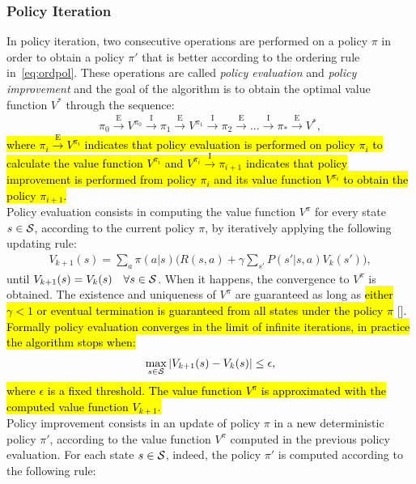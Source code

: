 \subsubsection{Policy Iteration}
In policy iteration, two consecutive operations are performed on a policy $\pi$ in order to obtain a policy $\pi'$ that is better according to the ordering rule in~\eqref{eq:ordpol}. These operations are called \emph{policy evaluation} and \emph{policy improvement} and the goal of the algorithm is to obtain the optimal value function $V^{*}$ through the sequence:
\begin{align}
\pi_{0} \xrightarrow{\text{E}} V^{\pi_{0}} \xrightarrow{\text{I}} \pi_{1} \xrightarrow{\text{E}} V^{\pi_{1}} \xrightarrow{\text{I}} \pi_{2} \xrightarrow{\text{E}} ... \xrightarrow{\text{I}} \pi_{*} \xrightarrow{\text{E}} V^{*},
\end{align}
\hl{where $\pi_{i} \xrightarrow{\text{E}} V^{\pi_{i}}$ indicates that policy evaluation is performed on policy $\pi_{i}$ to calculate the value function $V^{\pi_{i}}$ and $V^{\pi_{i}} \xrightarrow{\text{I}} \pi_{i+1}$ indicates that policy improvement is performed from policy $\pi_{i}$ and its value function $V^{\pi_{i}}$ to obtain the policy $\pi_{i+1}$.}\\
\newline
Policy evaluation consists in computing the value function $V^{\pi}$ for every state $s \in \mathcal{S}$, according to the current policy $\pi$, by iteratively applying the following updating rule:
\begin{align} V_{k+1}(s) = \sum_{a}\pi(a|s) \Big( R(s,a) + \gamma \sum_{s'}P(s'|s,a) V_{k}(s') \Big), \label{eq:updrule} \end{align}
until $V_{k+1}(s) = V_{k}(s) \quad \forall s \in \mathcal{S}$. When it happens, the convergence to $V^{\pi}$ is obtained. The existence and uniqueness of $V^{\pi}$ are guaranteed as long as \hl{either $\gamma<1$ or eventual termination is guaranteed from all states under the policy $\pi$} [\cite{sutton2018reinforcement}]. \hl{Formally policy evaluation converges in the limit of infinite iterations, in practice the algorithm stops when:}
\begin{align}
	\max_{s \in \mathcal{S}}|V_{k+1}(s) - V_{k}(s)| \leq \epsilon, \label{eq:stopcond}
\end{align}
\hl{where $\epsilon$ is a fixed threshold. The value function $V^{\pi}$ is approximated with the computed value function $V_{k+1}$.}\\
\newline
Policy improvement consists in an update of policy $\pi$ in a new deterministic policy $\pi'$, according to the value function $V^{\pi}$ computed in the previous policy evaluation. For each state $s \in \mathcal{S}$, indeed, the policy $\pi'$ is computed according to the following rule:
